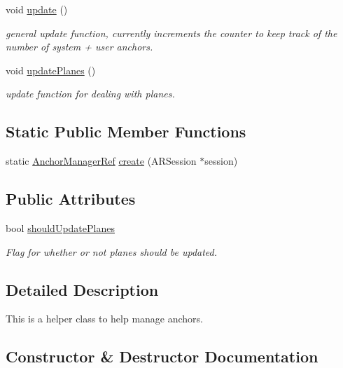 \begin{DoxyCompactItemize}
void \hyperlink{class_a_r_core_1_1_a_r_anchor_manager_af4b19656d608761d25661d6720a4c2f3}{update} ()
\begin{DoxyCompactList}\small\item\em general update function, currently increments the counter to keep track of the number of system + user anchors. \end{DoxyCompactList}\item 
void \hyperlink{class_a_r_core_1_1_a_r_anchor_manager_aa35c3487e0ba5980ff6b2fb43414bd57}{update\+Planes} ()
\begin{DoxyCompactList}\small\item\em update function for dealing with planes. \end{DoxyCompactList}\end{DoxyCompactItemize}
\subsection*{Static Public Member Functions}
\begin{DoxyCompactItemize}
\item 
static \hyperlink{namespace_a_r_core_a3f2b9ba00b51ce19c1010f554a66a512}{Anchor\+Manager\+Ref} \hyperlink{class_a_r_core_1_1_a_r_anchor_manager_ab1293c2f5911e273573b1df3643fd086}{create} (A\+R\+Session $\ast$session)
\end{DoxyCompactItemize}
\subsection*{Public Attributes}
\begin{DoxyCompactItemize}
\item 
bool \hyperlink{class_a_r_core_1_1_a_r_anchor_manager_af67de0a611ff8a2786891eabb0ca571f}{should\+Update\+Planes}
\begin{DoxyCompactList}\small\item\em Flag for whether or not planes should be updated. \end{DoxyCompactList}\end{DoxyCompactItemize}


\subsection{Detailed Description}
This is a helper class to help manage anchors. 

\subsection{Constructor \& Destructor Documentation}
\mbox{\label{class_a_r_core_1_1_a_r_anchor_manager_ad4f5727e58d9b4c6f582c50ba5ac0f49}} 
